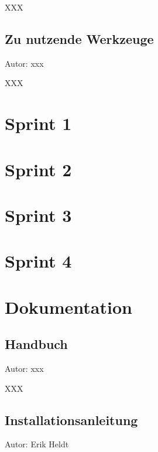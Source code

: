 \documentclass[twoside]{report}
\begin{document}
XXX

\subsection{Zu nutzende Werkzeuge}
{\small Autor: xxx}

XXX

\newpage


\section{Sprint 1}



\newpage

\section{Sprint 2}



\newpage

\section{Sprint 3}

%

\newpage

\section{Sprint 4}



\newpage



\section{Dokumentation}

\subsection{Handbuch}
{\small Autor: xxx}

XXX

\subsection{Installationsanleitung}
{\small Autor: Erik Heldt}
\end{document}
